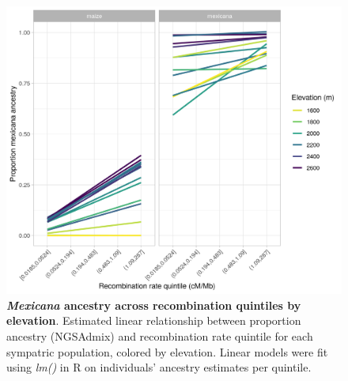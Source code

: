 \begin{figure}[ht]
\includegraphics[width=\textwidth]{chapter2/figures/K2_by_r_bootstrap_lm_elevation_color_elev.png}
\caption{\color{Gray} \textbf{\textit{Mexicana} ancestry across recombination quintiles by elevation}. Estimated linear relationship between proportion \mexicana ancestry (NGSAdmix) and recombination rate quintile for each sympatric population, colored by elevation. Linear models were fit using \textit{lm()} in R on individuals' ancestry estimates per quintile.}
\label{K2_by_r_elev_lm}
\end{figure}

